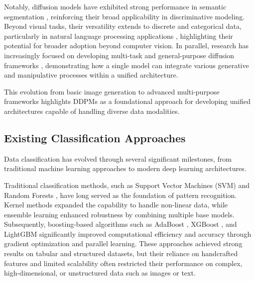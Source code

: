\documentclass[a4paper,fleqn]{cas-sc}
\begin{document}
Notably, diffusion models have exhibited strong performance in semantic segmentation \cite{luo2025label,wu2024medsegdiff}, reinforcing their broad applicability in discriminative modeling. Beyond visual tasks, their versatility extends to discrete and categorical data, particularly in natural language processing applications \cite{hoogeboom2021argmax,austin2021structured}, highlighting their potential for broader adoption beyond computer vision. In parallel, research has increasingly focused on developing multi-task and general-purpose diffusion frameworks \cite{blattmann2022retrieval,graikos2022diffusion,gao2021learning}, demonstrating how a single model can integrate various generative and manipulative processes within a unified architecture.

This evolution from basic image generation to advanced multi-purpose frameworks highlights DDPMs as a foundational approach for developing unified architectures capable of handling diverse data modalities. 

\subsection{Existing Classification Approaches}

Data classification has evolved through several significant milestones, from traditional machine learning approaches to modern deep learning architectures.

Traditional classification methods, such as Support Vector Machines (SVM) \cite{cortes1995support} and Random Forests \cite{breiman2001random}, have long served as the foundation of pattern recognition. Kernel methods \cite{scholkopf2002learning} expanded the capability to handle non-linear data, while ensemble learning \cite{dietterich2000ensemble} enhanced robustness by combining multiple base models. Subsequently, boosting-based algorithms such as AdaBoost \cite{ying2013advance}, XGBoost \cite{niazkar2024applications}, and LightGBM \cite{ke2017lightgbm} significantly improved computational efficiency and accuracy through gradient optimization and parallel learning. These approaches achieved strong results on tabular and structured datasets, but their reliance on handcrafted features and limited scalability often restricted their performance on complex, high-dimensional, or unstructured data such as images or text.
\end{document}
